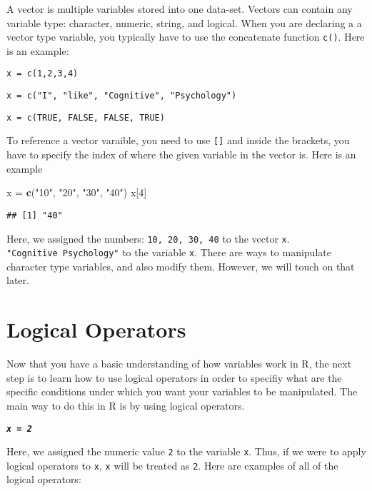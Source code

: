 \documentclass[]{book}
\newenvironment{Shaded}{\begin{snugshade}}{\end{snugshade}}
\newcommand{\KeywordTok}[1]{\textcolor[rgb]{0.13,0.29,0.53}{\textbf{#1}}}
\newcommand{\DecValTok}[1]{\textcolor[rgb]{0.00,0.00,0.81}{#1}}
\newcommand{\StringTok}[1]{\textcolor[rgb]{0.31,0.60,0.02}{#1}}
\newcommand{\NormalTok}[1]{#1}
\begin{document}
A vector is multiple variables stored into one data-set. Vectors can
contain any variable type: character, numeric, string, and logical. When
you are declaring a a vector type variable, you typically have to use
the concatenate function \texttt{c()}. Here is an example:

\texttt{x\ =\ c(1,2,3,4)}

\texttt{x\ =\ c("I",\ "like",\ "Cognitive",\ "Psychology")}

\texttt{x\ =\ c(TRUE,\ FALSE,\ FALSE,\ TRUE)}

To reference a vector varaible, you need to use \texttt{{[}{]}} and
inside the brackets, you have to specify the index of where the given
variable in the vector is. Here is an example

\begin{Shaded}
\begin{Highlighting}[]
\NormalTok{x =}\StringTok{ }\KeywordTok{c}\NormalTok{(}\StringTok{"10"}\NormalTok{, }\StringTok{"20"}\NormalTok{, }\StringTok{"30"}\NormalTok{, }\StringTok{"40"}\NormalTok{)}
\NormalTok{x[}\DecValTok{4}\NormalTok{]}
\end{Highlighting}
\end{Shaded}

\begin{verbatim}
## [1] "40"
\end{verbatim}

Here, we assigned the numbers: \texttt{10,\ 20,\ 30,\ 40} to the vector
\texttt{x}. \texttt{"Cognitive\ Psychology"} to the variable \texttt{x}.
There are ways to manipulate character type variables, and also modify
them. However, we will touch on that later.

\section{Logical Operators}\label{logical-operators}

Now that you have a basic understanding of how variables work in R, the
next step is to learn how to use logical operators in order to specifiy
what are the specific conditions under which you want your variables to
be manipulated. The main way to do this in R is by using logical
operators.

\textbf{\emph{\texttt{x\ =\ 2}}}

Here, we assigned the numeric value \texttt{2} to the variable
\texttt{x}. Thus, if we were to apply logical operators to \texttt{x},
\texttt{x} will be treated as \texttt{2}. Here are examples of all of
the logical operators:
\end{document}
